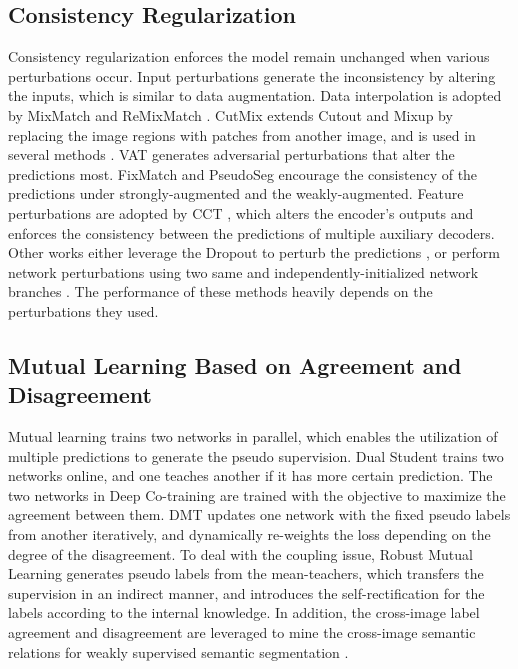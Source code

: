\documentclass[journal]{IEEEtran}
\begin{document}
\subsection{Consistency Regularization}
Consistency regularization enforces the model remain unchanged when various perturbations occur. Input perturbations \cite{kim2020structured} generate the inconsistency by 
altering the inputs, which is similar to data augmentation. Data interpolation is adopted by MixMatch \cite{MixMatch} and ReMixMatch \cite{berthelot2019remixmatch}. 
CutMix \cite{2019Semi} extends Cutout \cite{devries2017improved} and Mixup \cite{zhang2017mixup} by replacing the image regions with patches from another image, and is used 
in several methods \cite{RML, CPS}. VAT \cite{VAT} generates adversarial perturbations that alter the predictions most. FixMatch \cite{sohn2020fixmatch} and 
PseudoSeg \cite{pseudoseg} encourage the consistency of the predictions under strongly-augmented and the weakly-augmented. Feature perturbations are adopted by 
CCT \cite{CCT}, which alters the encoder's outputs and enforces the consistency between the predictions of multiple auxiliary decoders. Other works either leverage the Dropout 
to perturb the predictions \cite{park2018adversarial, laine2016temporal}, or perform network perturbations using two same and independently-initialized network 
branches \cite{GCT, CPS}. The performance of these methods heavily depends on the perturbations they used.

\subsection{Mutual Learning Based on Agreement and Disagreement}
Mutual learning trains two networks in parallel, which enables the utilization of multiple predictions to generate the pseudo supervision. Dual Student \cite{ke2019dual} 
trains two networks online, and one teaches another if it has more certain prediction. The two networks in Deep Co-training \cite{qiao2018deep} are trained with 
the objective to maximize the agreement between them. DMT \cite{2020DMT} updates one network with the fixed pseudo labels from another iteratively, and dynamically re-weights 
the loss depending on the degree of the disagreement. To deal with the coupling issue, Robust Mutual Learning \cite{RML} generates pseudo labels from the mean-teachers, which 
transfers the supervision in an indirect manner, and introduces the self-rectification for the labels according to the internal knowledge. In addition, the cross-image label 
agreement and disagreement are leveraged to mine the cross-image semantic relations for weakly supervised semantic segmentation \cite{sun2020mining}.
\end{document}
